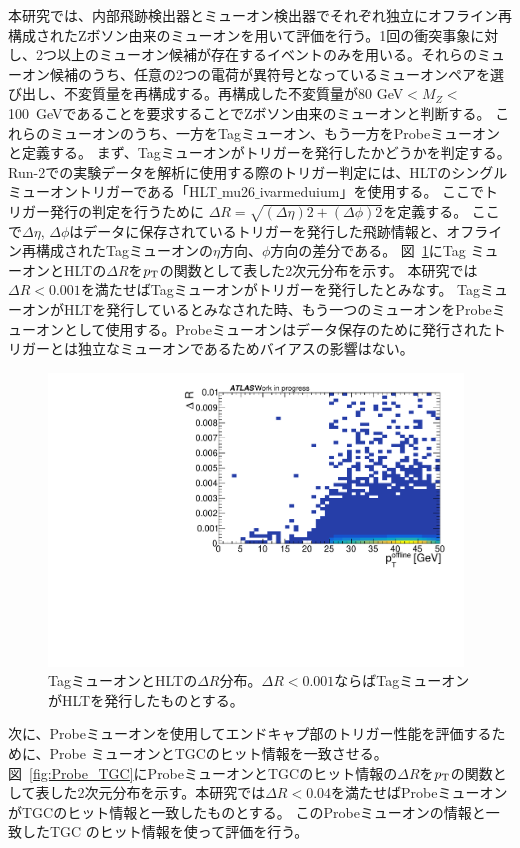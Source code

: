 本研究では、内部飛跡検出器とミューオン検出器でそれぞれ独立にオフライン再構成されたZボソン由来のミューオンを用いて評価を行う。1回の衝突事象に対し、2つ以上のミューオン候補が存在するイベントのみを用いる。それらのミューオン候補のうち、任意の2つの電荷が異符号となっているミューオンペアを選び出し、不変質量を再構成する。再構成した不変質量が80 GeV$<M_Z<$100~GeVであることを要求することでZボソン由来のミューオンと判断する。
これらのミューオンのうち、一方をTagミューオン、もう一方をProbeミューオンと定義する。
まず、Tagミューオンがトリガーを発行したかどうかを判定する。Run-2での実験データを解析に使用する際のトリガー判定には、HLTのシングルミューオントリガーである「HLT$\_$mu26$\_$ivarmeduium」を使用する。
ここでトリガー発行の判定を行うために $\Delta R= \sqrt{(\Delta \eta)2 + (\Delta \phi)2}$を定義する。
ここで$\Delta\eta$, $\Delta\phi$はデータに保存されているトリガーを発行した飛跡情報と、オフライン再構成されたTagミューオンの$\eta$方向、$\phi$方向の差分である。
図~\ref{fig:tag_HLT}にTag ミューオンとHLTの$\Delta R$を$p_{\rm{T}}$の関数として表した2次元分布を示す。
本研究では$\Delta R< 0.001$を満たせばTagミューオンがトリガーを発行したとみなす。
TagミューオンがHLTを発行しているとみなされた時、もう一つのミューオンをProbeミューオンとして使用する。Probeミューオンはデータ保存のために発行されたトリガーとは独立なミューオンであるためバイアスの影響はない。

\begin{figure}[htb]
  \centering
  \includegraphics[clip, width=11cm]{fig/5/dR_tag_HLT.pdf}
  \caption{TagミューオンとHLTの$\Delta R$分布。$\Delta R<0.001$ならばTagミューオンがHLTを発行したものとする。}
  \label{fig:tag_HLT}
\end{figure}

次に、Probeミューオンを使用してエンドキャプ部のトリガー性能を評価するために、Probe ミューオンとTGCのヒット情報を一致させる。図~\ref{fig:Probe_TGC}にProbeミューオンとTGCのヒット情報の$\Delta R$を$p_{\rm{T}}$の関数として表した2次元分布を示す。本研究では$\Delta R<0.04$を満たせばProbeミューオンがTGCのヒット情報と一致したものとする。
このProbeミューオンの情報と一致したTGC のヒット情報を使って評価を行う。

